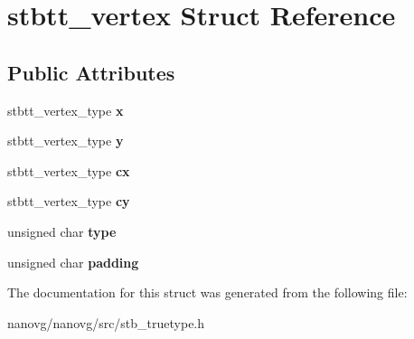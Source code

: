\hypertarget{structstbtt__vertex}{\section{stbtt\+\_\+vertex Struct Reference}
\label{structstbtt__vertex}
}
\subsection*{Public Attributes}
\begin{DoxyCompactItemize}
\item 
\hypertarget{structstbtt__vertex_a81773edbe760d0e090561a3c1e86c919}{stbtt\+\_\+vertex\+\_\+type {\bfseries x}}\label{structstbtt__vertex_a81773edbe760d0e090561a3c1e86c919}

\item 
\hypertarget{structstbtt__vertex_a9052065ca544b63d537325b246928cfc}{stbtt\+\_\+vertex\+\_\+type {\bfseries y}}\label{structstbtt__vertex_a9052065ca544b63d537325b246928cfc}

\item 
\hypertarget{structstbtt__vertex_a43835489e2a151b31cb100d20f8adeae}{stbtt\+\_\+vertex\+\_\+type {\bfseries cx}}\label{structstbtt__vertex_a43835489e2a151b31cb100d20f8adeae}

\item 
\hypertarget{structstbtt__vertex_a5610d6335aa6962d970fc7fd2225545e}{stbtt\+\_\+vertex\+\_\+type {\bfseries cy}}\label{structstbtt__vertex_a5610d6335aa6962d970fc7fd2225545e}

\item 
\hypertarget{structstbtt__vertex_aa325b3707b88e7e104c0de46bb2bf395}{unsigned char {\bfseries type}}\label{structstbtt__vertex_aa325b3707b88e7e104c0de46bb2bf395}

\item 
\hypertarget{structstbtt__vertex_a8bd328747e8ea018612960a52e3e3ede}{unsigned char {\bfseries padding}}\label{structstbtt__vertex_a8bd328747e8ea018612960a52e3e3ede}

\end{DoxyCompactItemize}


The documentation for this struct was generated from the following file\+:\begin{DoxyCompactItemize}
\item 
nanovg/nanovg/src/stb\+\_\+truetype.\+h\end{DoxyCompactItemize}
